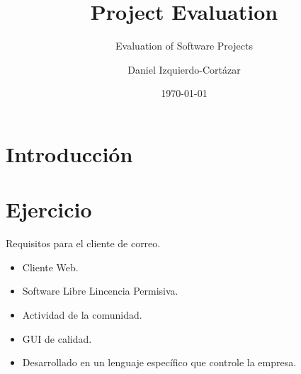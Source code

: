 \documentclass[11pt]{scrartcl}
\title{\textbf{Project Evaluation}}
\subtitle{Evaluation of Software Projects}
\author{Daniel Izquierdo-Cortázar}
\date{\today}
\begin{document}
\maketitle

\section{Introducción}

\section{Ejercicio}

Requisitos para el cliente de correo.
\begin{itemize}
    \item Cliente Web.
    \item Software Libre Lincencia Permisiva.
    \item Actividad de la comunidad.
    \item GUI de calidad.
    \item Desarrollado en un lenguaje específico que controle la empresa.
\end{itemize}
\end{document}
